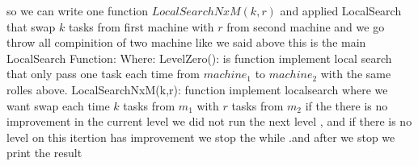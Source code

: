 \documentclass[11pt,fullpage]{article}
\begin{document}
so we can write one function $LocalSearchNxM(k,r)$ and applied LocalSearch that swap $k$ tasks from first machine with $r$ from second machine  and we go throw all compinition of two machine like we said above \newline
this is the main LocalSearch Function:\newline
Where: \newline
LevelZero(): is function implement local search that only pass one task each time from $machine_1$ to $machine_2$ with the same rolles above.\newline
 LocalSearchNxM(k,r): function implement localsearch where we want swap each time $k$ tasks from $m_1$ with $r$ tasks from $m_2$ \newline
if the there is no improvement in the current level we did not run the next level , and if there is no level on this itertion has improvement we stop the while .and after we stop we print the result
 
\end{document}
